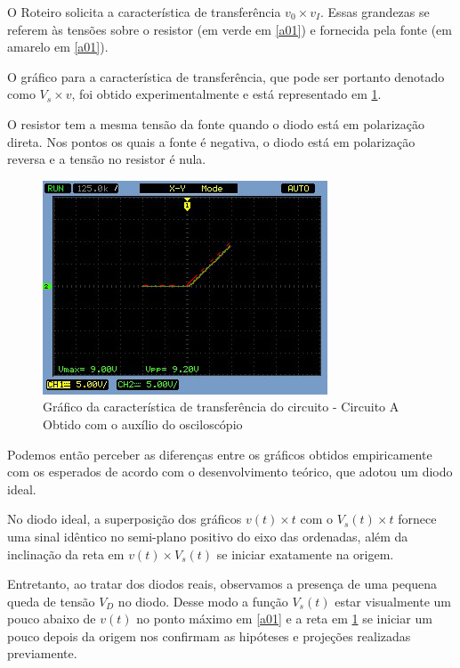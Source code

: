 \documentclass[10pt, final, a4paper]{IEEEtran} %
\begin{document}
O Roteiro solicita a característica de transferência $v_0 \times v_I$. Essas grandezas se referem às tensões sobre o resistor (em verde em \ref{a01}) e fornecida pela fonte (em amarelo em \ref{a01}).

O gráfico para a característica de transferência, que pode ser portanto denotado como $V_s \times v$, foi obtido experimentalmente e está representado em \ref{a02}.

O resistor tem a mesma tensão da fonte quando o diodo está em polarização direta. Nos pontos os quais a fonte é negativa, o diodo está em polarização reversa e a tensão no resistor é nula.

\begin{figure}[ht!]
	\captionsetup{justification=centering}
	\centering
	\includegraphics[width=0.8\linewidth]{imagens/circuitos_resp/a02.jpg}
	\caption{Gráfico da característica de transferência do circuito - Circuito A\\ Obtido com o auxílio do osciloscópio}
	\label{a02}
\end{figure}
\FloatBarrier

Podemos então perceber as diferenças entre os gráficos obtidos empiricamente com os esperados de acordo com o desenvolvimento teórico, que adotou um diodo ideal.

No diodo ideal, a superposição dos gráficos $v(t) \times t$ com o $V_s(t) \times t$ fornece uma sinal idêntico no semi-plano positivo do eixo das ordenadas, além da inclinação da reta em $v(t) \times V_s(t)$ se iniciar exatamente na origem.

Entretanto, ao tratar dos diodos reais, observamos a presença de uma pequena queda de tensão $V_D$ no diodo. Desse modo a função $V_s(t)$ estar visualmente um pouco abaixo de $v(t)$ no ponto máximo em \ref{a01} e a reta em \ref{a02} se iniciar um pouco depois da origem nos confirmam as hipóteses e projeções realizadas previamente.
\end{document}
